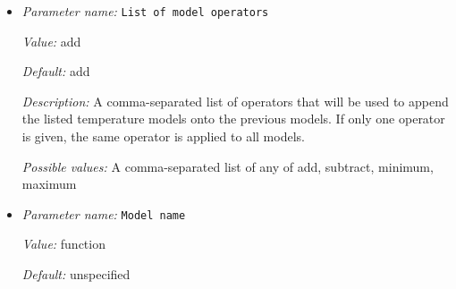 \begin{itemize}
`polar box': An initial temperature field in which the temperature is perturbed slightly from an otherwise constant value equal to one. The perturbation is such that there are two poles on opposing corners of the box. 

`spherical gaussian perturbation': An initial temperature field in which the temperature is perturbed by a single Gaussian added to an otherwise spherically symmetric state. Additional parameters are read from the parameter file in subsection 'Spherical gaussian perturbation'.

`spherical hexagonal perturbation': An initial temperature field in which the temperature is perturbed following an $N$-fold pattern in a specified direction from an otherwise spherically symmetric state. The class's name comes from previous versions when the only option was $N=6$.


{\it Possible values:} A comma-separated list of any of S40RTS perturbation, SAVANI perturbation, adiabatic, adiabatic boundary, ascii data, ascii profile, function, harmonic perturbation, inclusion shape perturbation, mandelbox, patch on S40RTS, perturbed box, polar box, spherical gaussian perturbation, spherical hexagonal perturbation
\item {\it Parameter name:} {\tt List of model operators}
\label{parameters:Initial temperature model/List of model operators}
\label{parameters:Initial_20temperature_20model/List_20of_20model_20operators}


{\it Value:} add


{\it Default:} add


{\it Description:} A comma-separated list of operators that will be used to append the listed temperature models onto the previous models. If only one operator is given, the same operator is applied to all models.


{\it Possible values:} A comma-separated list of any of add, subtract, minimum, maximum
\item {\it Parameter name:} {\tt Model name}
\label{parameters:Initial temperature model/Model name}
\label{parameters:Initial_20temperature_20model/Model_20name}


{\it Value:} function


{\it Default:} unspecified



\end{itemize}
